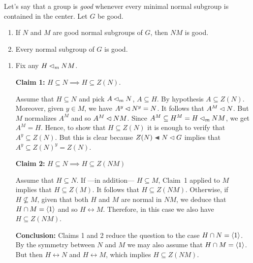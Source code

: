 \begin{exr}
    Let's say that a group is \textsl{good} whenever every minimal normal subgroup is contained in the center. Let\/ $G$ be good.
    \begin{enumerate}[\rm a)]
    \item If\/ $N$ and\/ $M$ are good normal subgroups of\/ $G$, then\/ $NM$ is good.
    \item Every normal subgroup of\/ $G$ is good.
    \end{enumerate}
\end{exr}

\begin{solution}
\begin{enumerate}[\rm a)]
    \item Fix any $H\lhd_mNM$.
    
    \textbf{Claim 1: } $H\subseteq N\implies H\subseteq Z(N)$.
    
    {\small Assume that $H\subseteq N$ and pick $A\lhd_mN$, $A\subseteq H$. By hypothesis $A\subseteq Z(N)$. Moreover, given $y\in M$, we have $A^y\lhd N^y=N$. It follows that $A^M\lhd N$. But $M$ normalizes $A^M$ and so $A^M\lhd NM$. Since $A^M\subseteq H^M=H\lhd_m NM$, we get $A^M=H$. Hence, to show that $H\subseteq Z(N)$ it is enough to verify that $A^y\subseteq Z(N)$. But this is clear because $Z(N)\ch N\normal G$ implies that $A^y\subseteq Z(N)^y=Z(N)$.}

    \medskip

    \textbf{Claim 2:} $H\subseteq N\implies H\subseteq Z(NM)$

    {\small Assume that $H\subseteq N$. If ---in addition--- $H\subseteq M$, Claim~1 applied to $M$ implies that $H\subseteq Z(M)$. It follows that $H\subseteq Z(NM)$. Otherwise, if $H\not\subseteq M$, given that both $H$ and $M$ are normal in $NM$, we deduce that $H\cap M=\langle1\rangle$ and so $H\leftrightarrow M$. Therefore, in this case we also have $H\subseteq Z(NM)$.}

    \medskip

    \textbf{Conclusion:} Claims 1 and 2 reduce the question to the case $H\cap N=\langle1\rangle$. By the symmetry between $N$ and $M$ we may also assume that $H\cap M=\langle1\rangle$. But then $H\leftrightarrow N$ and $H\leftrightarrow M$, which implies $H\subseteq Z(NM)$.


\end{enumerate}
\end{solution}
